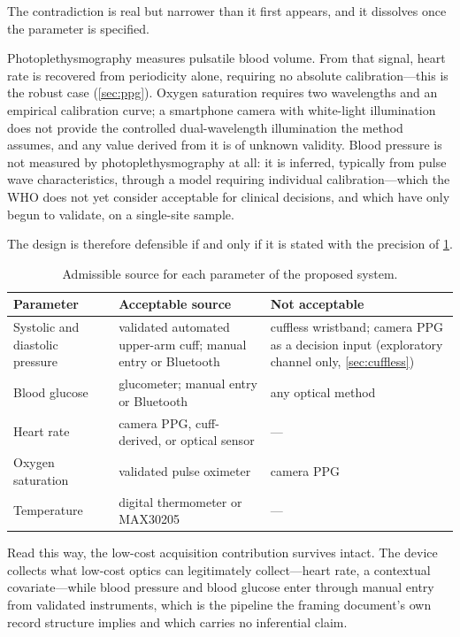 \documentclass[12pt,a4paper,oneside]{report}
\begin{document}
The contradiction is real but narrower than it first appears, and it dissolves once the parameter is specified.

Photoplethysmography measures pulsatile blood volume. From that signal, heart rate is recovered from periodicity alone, requiring no absolute calibration---this is the robust case (\cref{sec:ppg}). Oxygen saturation requires two wavelengths and an empirical calibration curve; a smartphone camera with white-light illumination does not provide the controlled dual-wavelength illumination the method assumes, and any value derived from it is of unknown validity. Blood pressure is not measured by photoplethysmography at all: it is inferred, typically from pulse wave characteristics, through a model requiring individual calibration---which the WHO does not yet consider acceptable for clinical decisions, and which \textcite{liu2025ppg} have only begun to validate, on a single-site sample.

The design is therefore defensible if and only if it is stated with the precision of \cref{tab:param-sources}.

\begin{table}[htbp]
\centering\small
\caption{Admissible source for each parameter of the proposed system.}\label{tab:param-sources}
\begin{tabularx}{\textwidth}{@{}>{\raggedright\arraybackslash}p{3.6cm} >{\raggedright\arraybackslash}X >{\raggedright\arraybackslash}p{4.2cm}@{}}
\toprule
\textbf{Parameter} & \textbf{Acceptable source} & \textbf{Not acceptable} \\
\midrule
Systolic and diastolic pressure & validated automated upper-arm cuff; manual entry or Bluetooth & cuffless wristband; camera PPG as a decision input (exploratory channel only, \cref{sec:cuffless}) \\
Blood glucose & glucometer; manual entry or Bluetooth & any optical method \\
Heart rate & camera PPG, cuff-derived, or optical sensor & --- \\
Oxygen saturation & validated pulse oximeter & camera PPG \\
Temperature & digital thermometer or MAX30205 & --- \\
\bottomrule
\end{tabularx}
\end{table}

Read this way, the low-cost acquisition contribution survives intact. The device collects what low-cost optics can legitimately collect---heart rate, a contextual covariate---while blood pressure and blood glucose enter through manual entry from validated instruments, which is the pipeline the framing document's own record structure implies and which carries no inferential claim.
\end{document}
